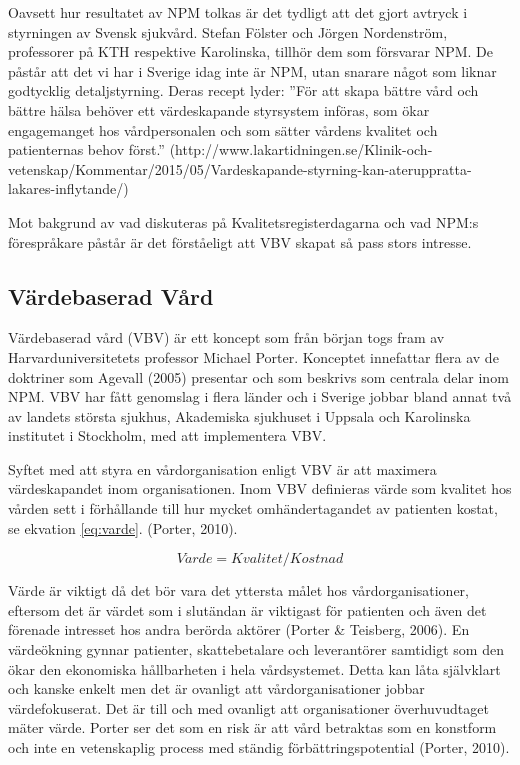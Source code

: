 Oavsett hur resultatet av NPM tolkas är det tydligt att det gjort avtryck i styrningen av Svensk sjukvård. Stefan Fölster och Jörgen Nordenström, professorer på KTH respektive Karolinska, tillhör dem som försvarar NPM. De påstår att det vi har i Sverige idag inte är NPM, utan snarare något som liknar godtycklig detaljstyrning. Deras recept lyder: ”För att skapa bättre vård och bättre hälsa behöver ett värdeskapande styrsystem införas, som ökar engagemanget hos vårdpersonalen och som sätter vårdens kvalitet och patienternas behov först.” (http://www.lakartidningen.se/Klinik-och-vetenskap/Kommentar/2015/05/Vardeskapande-styrning-kan-ateruppratta-lakares-inflytande/)

Mot bakgrund av vad diskuteras på Kvalitetsregisterdagarna och vad NPM:s förespråkare påstår är det förståeligt att VBV skapat så pass stors intresse. 

\subsection{Värdebaserad Vård}

Värdebaserad vård (VBV) är ett koncept som från början togs fram av Harvarduniversitetets professor Michael Porter. Konceptet innefattar flera av de doktriner som Agevall (2005) presentar och som beskrivs som centrala delar inom NPM. VBV har fått genomslag i flera länder och i Sverige jobbar bland annat två av landets största sjukhus, Akademiska sjukhuset i Uppsala och Karolinska institutet i Stockholm, med att implementera VBV.
 
Syftet med att styra en vårdorganisation enligt VBV är att maximera värdeskapandet inom organisationen. Inom VBV definieras värde som kvalitet hos vården sett i förhållande till hur mycket omhändertagandet av patienten kostat, se ekvation \ref{eq:varde}. (Porter, 2010).

\begin{equation}
\label{eq:varde}
	V \ddot{a} rde = Kvalitet/Kostnad
\end{equation}

Värde är viktigt då det bör vara det yttersta målet hos vårdorganisationer, eftersom det är värdet som i slutändan är viktigast för patienten och även det förenade intresset hos andra berörda aktörer (Porter \& Teisberg, 2006). En värdeökning gynnar patienter, skattebetalare och leverantörer samtidigt som den ökar den ekonomiska hållbarheten i hela vårdsystemet. Detta kan låta självklart och kanske enkelt men det är ovanligt att vårdorganisationer jobbar värdefokuserat. Det är till och med ovanligt att organisationer överhuvudtaget mäter värde. Porter ser det som en risk är att vård betraktas som en konstform och inte en vetenskaplig process med ständig förbättringspotential (Porter, 2010).
 
